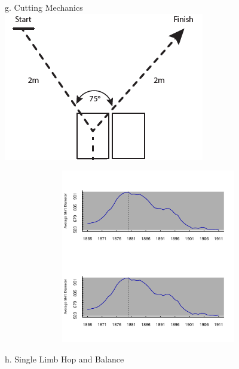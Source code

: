 \documentclass{article}\usepackage[]{graphicx}\usepackage[]{color}
\newenvironment{knitrout}{}{} %
\begin{document}
\newpage

g. Cutting Mechanics\\
\includegraphics{StartFinishAngle.PNG}\\
\begin{knitrout}
\color{fgcolor}

\includegraphics[width=5in,height=3in]{figure/latex-unnamed-chunk-10-1} \hfill{}



\end{knitrout}

\newpage
h. Single Limb Hop and Balance
\end{document}
